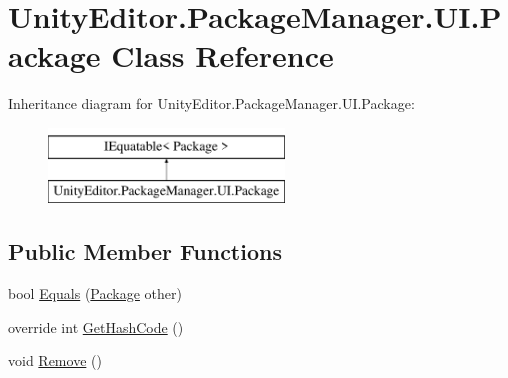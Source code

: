 \hypertarget{class_unity_editor_1_1_package_manager_1_1_u_i_1_1_package}{}\section{Unity\+Editor.\+Package\+Manager.\+U\+I.\+Package Class Reference}
\label{class_unity_editor_1_1_package_manager_1_1_u_i_1_1_package}
Inheritance diagram for Unity\+Editor.\+Package\+Manager.\+U\+I.\+Package\+:\begin{figure}[H]
\begin{center}
\leavevmode
\includegraphics[height=2.000000cm]{class_unity_editor_1_1_package_manager_1_1_u_i_1_1_package}
\end{center}
\end{figure}
\subsection*{Public Member Functions}
\begin{DoxyCompactItemize}
\item 
bool \mbox{\hyperlink{class_unity_editor_1_1_package_manager_1_1_u_i_1_1_package_ab39056f1dd2aa0783f6de3f9bd42e5cc}{Equals}} (\mbox{\hyperlink{class_unity_editor_1_1_package_manager_1_1_u_i_1_1_package}{Package}} other)
\item 
override int \mbox{\hyperlink{class_unity_editor_1_1_package_manager_1_1_u_i_1_1_package_a595f5f2201a65d9c83dc1f86b7b230fd}{Get\+Hash\+Code}} ()
\item 
void \mbox{\hyperlink{class_unity_editor_1_1_package_manager_1_1_u_i_1_1_package_aab70b50e6866314537b5c0a0edfd60ec}{Remove}} ()
\end{DoxyCompactItemize}
